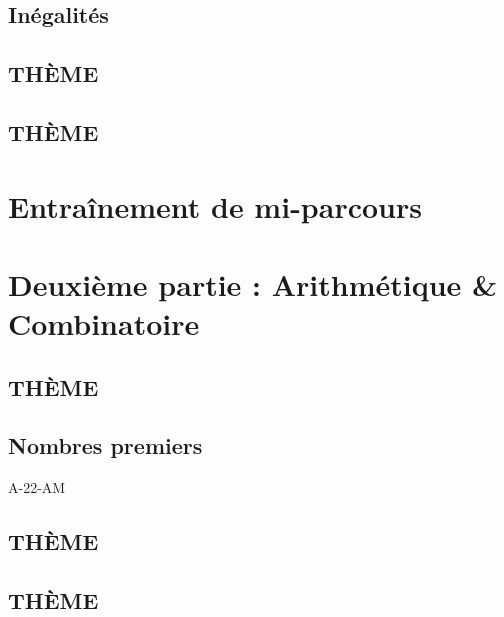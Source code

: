 \documentclass[poly,trombi]{valbonne}
\begin{document}

\subsection{Inégalités}


\subsection{THÈME}


\subsection{THÈME}






\section{Entraînement de mi-parcours}





\section{Deuxième partie : Arithmétique \& Combinatoire}

\subsection{THÈME}


\subsection{Nombres premiers}

{A-22-AM}

\subsection{THÈME}


\subsection{THÈME}
\end{document}
